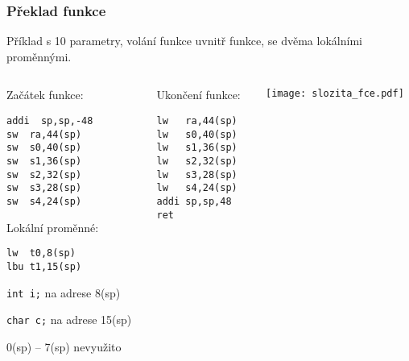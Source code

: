 \documentclass{beamer}
\begin{document}
\begin{frame}[fragile,shrink=5]
\frametitle{Překlad funkce}

Příklad s 10 parametry, volání funkce uvnitř funkce, se dvěma lokálními proměnnými.

\begin{columns}
\begin{column}{0.35\textwidth}
Začátek funkce:

\begin{verbatim}
addi  sp,sp,-48
sw  ra,44(sp)
sw  s0,40(sp)
sw  s1,36(sp)
sw  s2,32(sp)
sw  s3,28(sp)
sw  s4,24(sp)
\end{verbatim}

Lokální proměnné:
\begin{verbatim}
lw  t0,8(sp)
lbu t1,15(sp)
\end{verbatim}

\texttt{int i;} na adrese 8(sp)

\texttt{char c;} na adrese 15(sp)

0(sp) -- 7(sp) nevyužito


\end{column}   
\begin{column}{0.29\textwidth}
Ukončení funkce:

\begin{verbatim}
lw   ra,44(sp)
lw   s0,40(sp)
lw   s1,36(sp)
lw   s2,32(sp)
lw   s3,28(sp)
lw   s4,24(sp)
addi sp,sp,48
ret
\end{verbatim}

\end{column}
\begin{column}{0.35\textwidth}  
\texttt{[image: slozita\_fce.pdf]}
\end{column}
\end{columns}
\end{frame}
\end{document}
